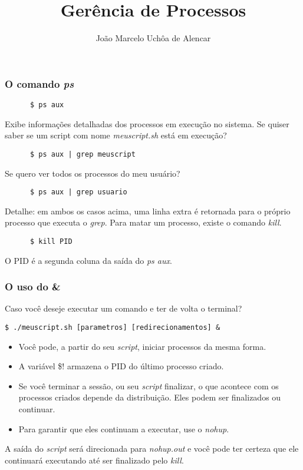 \documentclass{beamer}
\title{Gerência de Processos}
\author[João Marcelo Uchôa de Alencar]{João Marcelo Uchôa de Alencar}
\institute{Universidade Federal do Ceará - Quixadá}
\begin{document}
   \begin{frame}
      \titlepage
   \end{frame}

   \begin{frame}[fragile]
      \frametitle{O comando \textit{ps}}
      \begin{verbatim}
      $ ps aux 
      \end{verbatim}
      Exibe informações detalhadas dos processos em execução no sistema. Se quiser saber se um script com nome \textit{meuscript.sh} está em execução? 
      \begin{verbatim}
      $ ps aux | grep meuscript
      \end{verbatim}
      Se quero ver todos os processos do meu usuário? 
      \begin{verbatim}
      $ ps aux | grep usuario
      \end{verbatim}
      Detalhe: em ambos os casos acima, uma linha extra é retornada para o próprio processo que executa o \textit{grep}. Para matar um processo, existe o comando \textit{kill}. 
      \begin{verbatim}
      $ kill PID
      \end{verbatim}
      O PID é a segunda coluna da saída do \textit{ps aux}.
\end{frame}

   \begin{frame}[fragile]
      \frametitle{O uso do \&}
      Caso você deseje executar um comando e ter de volta o terminal?
      \begin{verbatim}
$ ./meuscript.sh [parametros] [redirecionamentos] &
      \end{verbatim}
      \begin{itemize}
         \item Você pode, a partir do seu \textit{script}, iniciar processos da mesma forma.
         \item A variável \$! armazena o PID do último processo criado. 
         \item Se você terminar a sessão, ou seu \textit{script} finalizar, o que acontece com os processos criados depende da distribuição. Eles podem ser finalizados ou continuar. 
         \item Para garantir que eles continuam a executar, use o \textit{nohup}. 
      \end{itemize}   
      A saída do \textit{script} será direcionada para \textit{nohup.out} e você pode ter certeza que ele continuará executando até ser finalizado pelo \textit{kill}.
\end{frame}
\end{document}
